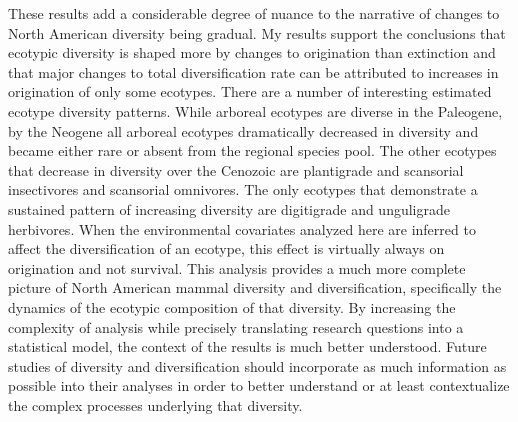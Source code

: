 These results add a considerable degree of nuance to the narrative of changes to North American diversity being gradual. My results support the conclusions that ecotypic diversity is shaped more by changes to origination than extinction and that major changes to total diversification rate can be attributed to increases in origination of only some ecotypes. There are a number of interesting estimated ecotype diversity patterns. While arboreal ecotypes are diverse in the Paleogene, by the Neogene all arboreal ecotypes dramatically decreased in diversity and became either rare or absent from the regional species pool. The other ecotypes that decrease in diversity over the Cenozoic are plantigrade and scansorial insectivores and scansorial omnivores. The only ecotypes that demonstrate a sustained pattern of increasing diversity are digitigrade and unguligrade herbivores. When the environmental covariates analyzed here are inferred to affect the diversification of an ecotype, this effect is virtually always on origination and not survival. This analysis provides a much more complete picture of North American mammal diversity and diversification, specifically the dynamics of the ecotypic composition of that diversity. By increasing the complexity of analysis while precisely translating research questions into a statistical model, the context of the results is much better understood. Future studies of diversity and diversification should incorporate as much information as possible into their analyses in order to better understand or at least contextualize the complex processes underlying that diversity.
